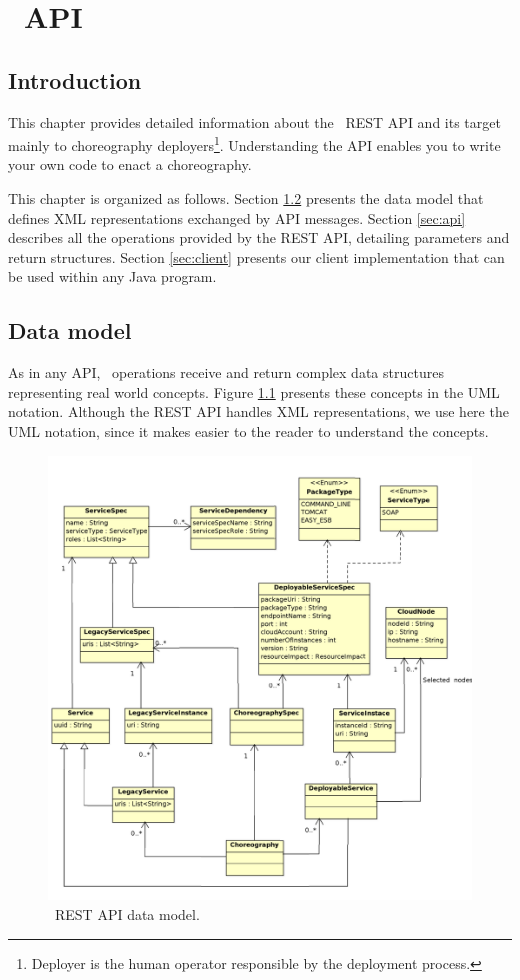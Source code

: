 
\chapter{\ee\ API}
\label{chap:rest-api}

\section{Introduction}

This chapter provides detailed information about the \ee\ REST API and its target mainly to choreography deployers\footnote{Deployer is the human operator responsible by the deployment process.}.
Understanding the API enables you to write your own code to enact a choreography. 

This chapter is organized as follows. Section \ref{sec:model} presents the data model that defines XML representations exchanged by API messages. Section \ref{sec:api} describes all the operations provided by the REST API, detailing parameters and return structures. Section \ref{sec:client} presents our client implementation that can be used within any Java program.

\section{Data model}
\label{sec:model}

As in any API, \ee\ operations receive and return complex data structures representing real world concepts. 
Figure \ref{img:data_model} presents these concepts in the UML notation.
Although the REST API handles XML representations, we use here the UML notation, since it makes easier to the reader to understand the concepts.

\begin{figure}
\centering
\includegraphics[scale=1.6]{img/data_model.pdf}
\caption{\ee\ REST API data model. }
\label{img:data_model}
\end{figure}


